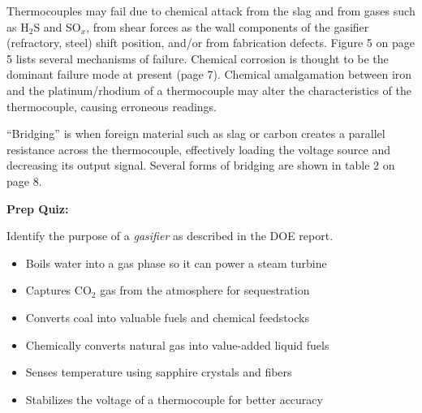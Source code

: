 \vskip 10pt

Thermocouples may fail due to chemical attack from the slag and from gases such as H$_{2}$S and SO$_{x}$, from shear forces as the wall components of the gasifier (refractory, steel) shift position, and/or from fabrication defects.  Figure 5 on page 5 lists several mechanisms of failure.  Chemical corrosion is thought to be the dominant failure mode at present (page 7).  Chemical amalgamation between iron and the platinum/rhodium of a thermocouple may alter the characteristics of the thermocouple, causing erroneous readings.

\vskip 10pt

``Bridging'' is when foreign material such as slag or carbon creates a parallel resistance across the thermocouple, effectively loading the voltage source and decreasing its output signal.  Several forms of bridging are shown in table 2 on page 8.





\vfil \eject

\noindent
{\bf Prep Quiz:}

Identify the purpose of a {\it gasifier} as described in the DOE report.

\begin{itemize}
\item{} Boils water into a gas phase so it can power a steam turbine
\vskip 5pt
\item{} Captures CO$_{2}$ gas from the atmosphere for sequestration
\vskip 5pt 
\item{} Converts coal into valuable fuels and chemical feedstocks
\vskip 5pt 
\item{} Chemically converts natural gas into value-added liquid fuels
\vskip 5pt 
\item{} Senses temperature using sapphire crystals and fibers
\vskip 5pt 
\item{} Stabilizes the voltage of a thermocouple for better accuracy
\end{itemize}








